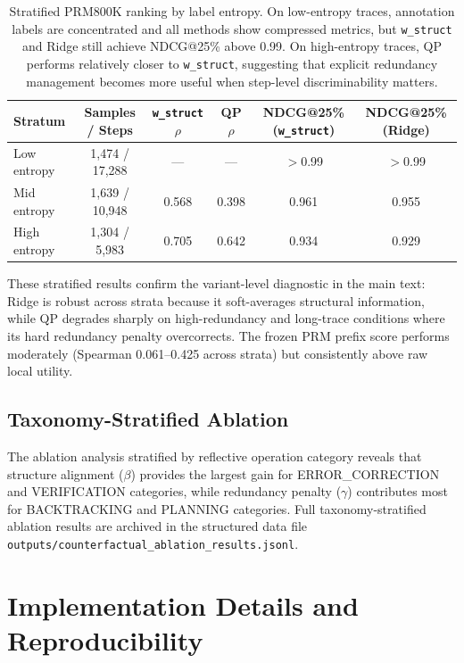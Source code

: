\documentclass[a4paper,fleqn]{cas-sc}
\begin{document}
\begin{table}[ht]
\caption{Stratified PRM800K ranking by label entropy. On low-entropy traces, annotation labels are concentrated and all methods show compressed metrics, but \texttt{w\_struct} and Ridge still achieve NDCG@25\% above 0.99. On high-entropy traces, QP performs relatively closer to \texttt{w\_struct}, suggesting that explicit redundancy management becomes more useful when step-level discriminability matters.}
\label{tab:s2-label-entropy}
\centering
\small
\begin{tabular}{lccccc}
\toprule
\textbf{Stratum} & \textbf{Samples / Steps} & \textbf{\texttt{w\_struct} $\rho$} & \textbf{QP $\rho$} & \textbf{NDCG@25\% (\texttt{w\_struct})} & \textbf{NDCG@25\% (Ridge)} \\
\midrule
Low entropy  & 1,474 / 17,288 & ---   & ---   & $>$0.99 & $>$0.99 \\
Mid entropy  & 1,639 / 10,948 & 0.568 & 0.398 & 0.961   & 0.955   \\
High entropy & 1,304 / 5,983  & 0.705 & 0.642 & 0.934   & 0.929   \\
\bottomrule
\end{tabular}
\end{table}

These stratified results confirm the variant-level diagnostic in the main text: Ridge is robust across strata because it soft-averages structural information, while QP degrades sharply on high-redundancy and long-trace conditions where its hard redundancy penalty overcorrects. The frozen PRM prefix score performs moderately (Spearman 0.061--0.425 across strata) but consistently above raw local utility.

\subsection{Taxonomy-Stratified Ablation}
\label{app:taxonomy-ablation}

The ablation analysis stratified by reflective operation category reveals that structure alignment ($\beta$) provides the largest gain for ERROR\_CORRECTION and VERIFICATION categories, while redundancy penalty ($\gamma$) contributes most for BACKTRACKING and PLANNING categories. Full taxonomy-stratified ablation results are archived in the structured data file \texttt{outputs/counterfactual\_ablation\_results.jsonl}.

\section{Implementation Details and Reproducibility}
\label{app:implementation}
\end{document}
